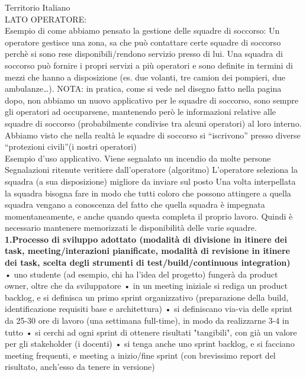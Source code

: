\documentclass[10pt,english]{article}
\begin{document}
Territorio Italiano\\

LATO OPERATORE: \\
Esempio di come abbiamo pensato la gestione delle squadre di soccorso: 
Un operatore gestisce una zona, sa che può contattare certe squadre di soccorso perchè si sono rese disponibili/rendono servizio presso di lui. Una squadra di soccorso può fornire i propri servizi a più operatori e sono definite in termini di mezzi che hanno a disposizione (es. due volanti, tre camion dei pompieri, due ambulanze…). 
{NOTA: in pratica, come si vede nel disegno fatto nella pagina dopo, non abbiamo un nuovo applicativo per le squadre di soccorso, sono sempre gli operatori ad occuparsene, mantenendo però le informazioni relative alle squadre di soccorso (probabilmente condivise tra alcuni operatori) al loro interno. Abbiamo visto che nella realtà le squadre di soccorso si “iscrivono” presso diverse “protezioni civili”(i nostri operatori)}\\

Esempio d’uso applicativo.
Viene segnalato un incendio da molte persone 
Segnalazioni ritenute veritiere dall’operatore (algoritmo)
L’operatore seleziona la squadra (a sua disposizione) migliore da inviare sul posto 
Una volta interpellata la squadra bisogna fare in modo che tutti coloro che possono attingere a quella squadra vengano a conoscenza del fatto che quella squadra è impegnata momentaneamente, e anche quando questa completa il proprio lavoro. Quindi è necessario mantenere memorizzati le disponibilità delle varie squadre.\\



\textbf{1.Processo di sviluppo adottato (modalità di divisione in itinere dei task, meeting/interazioni pianificate, modalità di revisione in itinere dei task, scelta degli strumenti di test/build/continuous integration)} \\

•	uno studente (ad esempio, chi ha l'idea del progetto) fungerà da product owner, oltre che da sviluppatore
•	in un meeting iniziale si rediga un product backlog, e si definisca un primo sprint organizzativo (preparazione della build, identificazione requisiti base e architettura)
•	si definiscano via-via delle sprint da 25-30 ore di lavoro (una settimana full-time), in modo da realizzarne 3-4 in tutto
•	si cerchi ad ogni sprint di ottenere risultati "tangibili", con già un valore per gli stakeholder (i docenti)
•	si tenga anche uno sprint backlog, e si facciano meeting frequenti, e meeting a inizio/fine sprint (con brevissimo report del risultato, anch'esso da tenere in versione)
\end{document}

